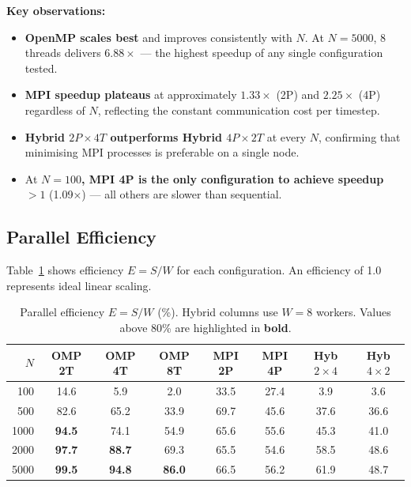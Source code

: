 ﻿\documentclass[12pt,a4paper]{article}
\begin{document}
\noindent\textbf{Key observations:}
\begin{itemize}
    \item \textbf{OpenMP scales best} and improves consistently with $N$.
          At $N=5000$, 8 threads delivers $6.88\times$ --- the highest
          speedup of any single configuration tested.
    \item \textbf{MPI speedup plateaus} at approximately $1.33\times$ (2P)
          and $2.25\times$ (4P) regardless of $N$, reflecting the constant
          communication cost per timestep.
    \item \textbf{Hybrid $2P \times 4T$ outperforms Hybrid $4P \times 2T$}
          at every $N$, confirming that minimising MPI processes is
          preferable on a single node.
    \item At \textbf{$N=100$, MPI 4P is the only configuration to achieve
          speedup $>1$} (1.09$\times$) --- all others are slower than
          sequential.
\end{itemize}

\subsection{Parallel Efficiency}

Table~\ref{tab:efficiency} shows efficiency $E = S/W$ for each configuration.
An efficiency of 1.0 represents ideal linear scaling.

\begin{table}[H]
\centering
\caption{Parallel efficiency $E = S/W$ (\%). Hybrid columns use $W=8$ workers.
         Values above 80\% are highlighted in \textbf{bold}.}
\label{tab:efficiency}
\begin{tabular}{rccccccc}
    \toprule
    $N$ & OMP 2T & OMP 4T & OMP 8T & MPI 2P & MPI 4P
        & Hyb $2{\times}4$ & Hyb $4{\times}2$ \\
    \midrule
    100  & 14.6 & 5.9  & 2.0  & 33.5 & 27.4 &  3.9 &  3.6 \\
    500  & 82.6 & 65.2 & 33.9 & 69.7 & 45.6 & 37.6 & 36.6 \\
    1000 & \textbf{94.5} & 74.1 & 54.9 & 65.6 & 55.6 & 45.3 & 41.0 \\
    2000 & \textbf{97.7} & \textbf{88.7} & 69.3 & 65.5 & 54.6 & 58.5 & 48.6 \\
    5000 & \textbf{99.5} & \textbf{94.8} & \textbf{86.0}
         & 66.5 & 56.2 & 61.9 & 48.7 \\
    \bottomrule
\end{tabular}
\end{table}
\end{document}
